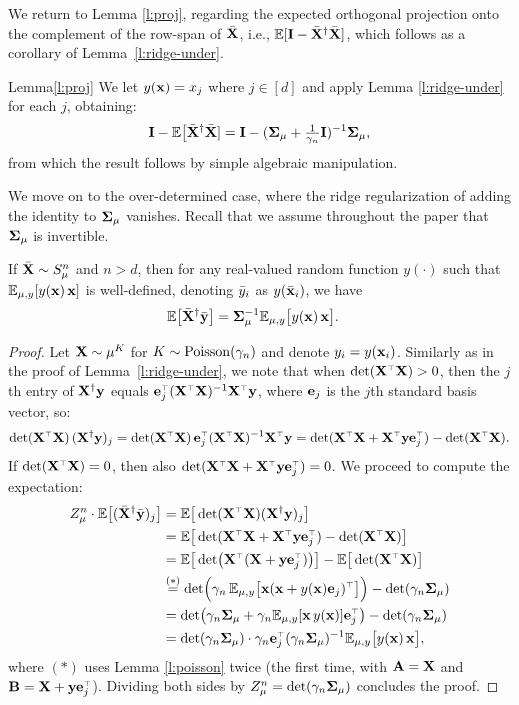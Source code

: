 We return to Lemma \ref{l:proj}, regarding the expected orthogonal
projection onto the complement of the row-span of ${\bar{\mathbf X}}$, i.e.,
$\mathbb E[\mathbf I-{\bar{\mathbf X}}^\dagger{\bar{\mathbf X}}]$, which follows as a corollary of Lemma~\ref{l:ridge-under}.
\begin{proofof}{Lemma}{\ref{l:proj}}
  We let $y(\mathbf x)=x_j$ where $j\in[d]$ and apply Lemma
  \ref{l:ridge-under} for each $j$, obtaining:
  \begin{align*}
    \mathbf I - \mathbb E\big[{\bar{\mathbf X}}^\dagger{\bar{\mathbf X}}] = \mathbf I -
    (\mathbf{\Sigma}_\mu+\tfrac1{\gamma_n}\mathbf I)^{-1}\mathbf{\Sigma}_\mu,
  \end{align*}
  from which the result follows by simple algebraic manipulation.
\end{proofof}

We move on to the over-determined case, where the ridge regularization
of adding the identity to $\mathbf{\Sigma}_\mu$ vanishes. Recall that we
assume throughout the paper that $\mathbf{\Sigma}_\mu$ is invertible.
\begin{lemma}\label{l:ridge-over}
  If ${\bar{\mathbf X}}\sim S_\mu^n$ and $n>d$, then for any real-valued random function $y(\cdot)$
  such that $\mathbb E_{\mu,y}[y(\mathbf x)\,\mathbf x]$ is well-defined,
denoting ${\bar y}_i$ as $y(\bar{\mathbf x}_i)$, we have
 \begin{align*}
  \mathbb E\big[{\bar{\mathbf X}}^\dagger \bar{\mathbf y}\big]
  &=\mathbf{\Sigma}_\mu^{-1}\mathbb E_{\mu,y}\big[y(\mathbf x)\,\mathbf x\big].
\end{align*}
\end{lemma}
\begin{proof}
   Let $\mathbf X\sim\mu^K$ for $K\sim{\operatorname{Poisson}}(\gamma_n)$ and denote
   $y_i=y(\mathbf x_i)$. Similarly as in the proof of
   Lemma~\ref{l:ridge-under}, we note that when $\det(\X^\top\X)>0$,
   then
  the $j$th entry of $\mathbf X^\dagger\mathbf y$ equals
  $\e_j^\top(\X^\top\X)^{-1}\X^\top\y$, where $\mathbf e_j$ is the $j$th
standard basis vector, so:
\begin{align*}
  \det(\X^\top\X)\,(\X^\dagger\y)_j =
  \det(\X^\top\X)\, \e_j^\top(\X^\top\X)^{-1}\X^\top\y =
  \det(\X^\top\X+\X^\top\y\e_j^\top) - \det(\X^\top\X).
\end{align*}
If $\det(\X^\top\X)=0$, then also
$\det(\X^\top\X+\X^\top\y\e_j^\top)=0$. We proceed to compute the
expectation:
\begin{align*}
Z_\mu^n\cdot\E\big[(\Xb^\dagger\ybb)_j\big]
  &=  \E\big[\det(\X^\top\X)(\X^\dagger\y)_j\big] \\
  &= \E\big[\det(\X^\top\X+\X^\top\y\e_j^\top)-\det(\X^\top\X)\big]  \\
  &=\E\big[\det\!\big(\X^\top(\X+\y\e_j^\top)\big)\big] - \E\big[\det(\X^\top\X)\big]\\
  &\overset{(*)}{=}\det\!\Big(
    \gamma_n\,\E_{\mu,y}\big[\x(\x+ y(\x)\e_j)^\top\big]\Big)
    -\det(\gamma_n\Sigmab_\mu)\\
  &=\det\!\big(\gamma_n\Sigmab_\mu + \gamma_n\E_{\mu,y}[\x\,y(\x)]\e_j^\top\big)
    -\det(\gamma_n\Sigmab_\mu)\\
  &=\det(\gamma_n\Sigmab_\mu)\cdot
    \gamma_n\e_j^\top(\gamma_n\Sigmab_\mu)^{-1}\E_{\mu,y}\big[y(\x)\,\x\big],
\end{align*}
where $(*)$ uses Lemma \ref{l:poisson} twice (the first time, with
$\mathbf A=\mathbf X$ and $\B=\X+\y\e_j^\top$). Dividing both sides by
$Z_\mu^n=\det(\gamma_n\mathbf{\Sigma}_\mu)$ concludes the proof.
\end{proof}

